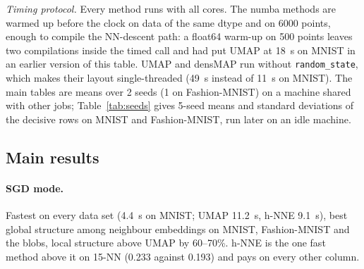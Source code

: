 \documentclass[11pt]{article}
\begin{document}
\emph{Timing protocol.} Every method runs with all cores. The numba methods are warmed up before the
clock on data of the same dtype and on 6000 points, enough to compile the NN-descent path: a float64
warm-up on 500 points leaves two compilations inside the timed call and had put UMAP at 18~s on MNIST in
an earlier version of this table. UMAP and densMAP run without \texttt{random\_state}, which makes
their layout single-threaded (49~s instead of 11~s on MNIST). The main tables are means over 2 seeds
(1 on Fashion-MNIST) on a machine shared with other jobs; Table~\ref{tab:seeds} gives 5-seed means
and standard deviations of the decisive rows on MNIST and Fashion-MNIST, run later on an idle machine.

\subsection{Main results}
\begin{table}[t]
\centering\small
\caption{MNIST 70k $\times$ 784, mean over 2 seeds, defaults for every method, best per column in bold.}
\label{tab:mnist}
\resizebox{\textwidth}{!}{}
\end{table}
\begin{table}[t]
\centering\small
\caption{Fashion-MNIST 70k (1 seed).}\label{tab:fmnist}
\resizebox{\textwidth}{!}{}
\end{table}
\begin{table}[t]
\centering\small
\caption{20 newsgroups (18.8k $\times$ 300, cosine, 2 seeds).}\label{tab:news20}
\resizebox{\textwidth}{!}{}
\end{table}
\begin{table}[t]
\centering\small
\caption{15 Gaussian blobs (10k $\times$ 200, 2 seeds).}\label{tab:blobs}

\end{table}
\begin{table}[t]
\centering\small
\caption{Seed dispersion of the decisive rows (\texttt{benchmarks/seeds.py}, 5 seeds, all cores; UMAP
without \texttt{random\_state}, so its seeds are numba's). Mean $\pm$ standard deviation; centroids is
the Spearman correlation of the 45 inter-centroid distances of the ten classes (Sec.~\ref{sec:global}).}
\label{tab:seeds}
\resizebox{\textwidth}{!}{}
\end{table}

\paragraph{SGD mode.} Fastest on every data set (4.4~s on MNIST; UMAP 11.2~s, h-NNE 9.1~s), best global
structure among neighbour embeddings on MNIST, Fashion-MNIST and the blobs, local structure above UMAP by
60--70\%. h-NNE is the one fast method above it on 15-NN (0.233 against 0.193) and pays on every other
column.
\end{document}
